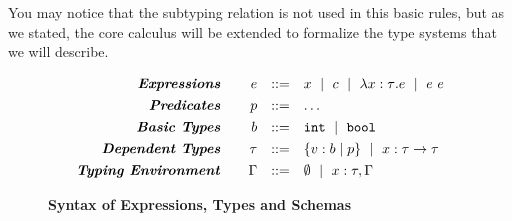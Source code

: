 You may notice that the subtyping relation 
is not used in this basic rules,
but as we stated, the core calculus will be extended to formalize the
type systems that we will describe.

\begin{figure}[t!]
\centering
$$
\begin{array}{rrcl}
\emphbf{Expressions} \quad 
  & e 
  & ::= 
  &      x 
  \spmid c 
  \spmid \efunt{x}{\tau}{e} 
  \spmid \eapp{e}{e} 
  \\[0.05in] 

\emphbf{Predicates} \quad 
  & p
  & ::= 
  & \dots
  \\[0.05in] 

\emphbf{Basic Types} \quad 
  & b 
  & ::= 
  &      \tbint
  \spmid \tbbool
  \\[0.05in]

\emphbf{Dependent Types} \quad 
  & \tau 
  & ::= 
  &      \tref{b}{p} 
  \spmid \tfun{x}{\tau}{\tau}
  \\[0.05in]

\emphbf{Typing Environment} \quad 
  & \Gamma 
  & ::= 
  &      \emptyset 
  \spmid x:\tau, \Gamma

\end{array}
$$
\caption{\textbf{Syntax of Expressions, Types and Schemas}}
\label{fig:syntax}
\end{figure}


